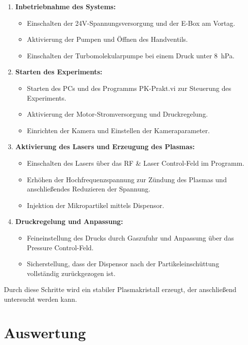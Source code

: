 \documentclass[12pt,a4paper,ngerman]{article}
\begin{document}
\begin{enumerate}
    \item \textbf{Inbetriebnahme des Systems:}
    \begin{itemize}
        \item Einschalten der 24V-Spannungsversorgung und der E-Box am Vortag.
        \item Aktivierung der Pumpen und Öffnen des Handventils.
        \item Einschalten der Turbomolekularpumpe bei einem Druck unter \SI{8}{\hecto\pascal}. %
    \end{itemize}
    \item \textbf{Starten des Experiments:}
    \begin{itemize}
        \item Starten des PCs und des Programms \glqq{}PK-Prakt.vi\grqq{} zur Steuerung des Experiments.
        \item Aktivierung der Motor-Stromversorgung und Druckregelung.
        \item Einrichten der Kamera und Einstellen der Kameraparameter.
    \end{itemize}
    \item \textbf{Aktivierung des Lasers und Erzeugung des Plasmas:}
    \begin{itemize}
        \item Einschalten des Lasers über das \glqq{}RF \& Laser Control\grqq{}-Feld im Programm.
        \item Erhöhen der Hochfrequenzspannung zur Zündung des Plasmas und anschließendes Reduzieren der Spannung.
        \item Injektion der Mikropartikel mittels Dispensor.
    \end{itemize}
    \item \textbf{Druckregelung und Anpassung:}
    \begin{itemize}
        \item Feineinstellung des Drucks durch Gaszufuhr und Anpassung über das \glqq{}Pressure Control\grqq{}-Feld.
        \item Sicherstellung, dass der Dispensor nach der Partikeleinschüttung vollständig zurückgezogen ist.
    \end{itemize}
\end{enumerate}

Durch diese Schritte wird ein stabiler Plasmakristall erzeugt, der anschließend untersucht werden kann.	


\section{Auswertung}
	
\end{document}
